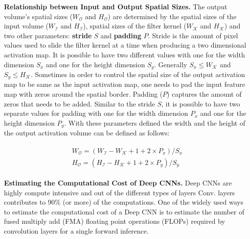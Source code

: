 \vspace{2mm}
\noindent \textbf{Relationship between Input and Output Spatial Sizes.}
The output volume's spatial sizes ($W_{\mathcal{O}}$ and $H_{\mathcal{O}}$) are determined by the spatial sizes of the input volume ($W_{\mathcal{I}}$ and $H_{\mathcal{I}}$), spatial sizes of the filter kernel ($W_\mathcal{K}$ and $H_\mathcal{K}$) and two other parameters: \textbf{stride} $S$ and \textbf{padding} $P$.
Stride is the amount of pixel values used to slide the filter kernel at a time when producing a two dimensional activation map.
It is possible to have two different values with one for the width dimension $S_x$ and one for the height dimension $S_y$.
Generally $S_x \leq W_\mathcal{K}$ and $S_y \leq H_\mathcal{K}$.
Sometimes in order to control the spatial size of the output activation map to be same as the input activation map, one needs to pad the input feature map with zeros around the spatial border.
Padding ($P$) captures the amount of zeros that needs to be added.
Similar to the stride $S$, it is possible to have two separate values for padding with one for the width dimension $P_x$ and one for the height dimension $P_y$.
With these parameters defined the width and the height of the output activation volume can be defined as follows:

\begin{align}
\begin{split}
W_{\mathcal{O}} = (W_{\mathcal{I}} - W_\mathcal{K} + 1 + 2\times P_x)/S_x \\
H_{\mathcal{O}} = (H_{\mathcal{I}} - H_\mathcal{K} + 1 + 2\times P_y)/S_y
\end{split}
\end{align}

\vspace{2mm}
\noindent \textbf{Estimating the Computational Cost of Deep CNNs.}
Deep CNNs are highly compute intensive and out of the different types of layers Conv. layers contributes to $90\%$ (or more) of the computations. One of the widely used ways to estimate the computational cost of a Deep CNN is to estimate the number of fused multiply add (FMA) floating point operations (FLOPs) required by convolution layers for a single forward inference.

